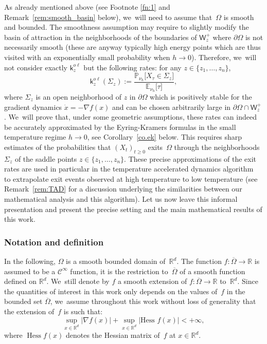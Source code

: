 \documentclass[JEP,XML,SOM,Unicode,NoEqCountersInSection,NoFloatCountersInSection,published]{cedram}
\DeclareMathOperator{\hess}{Hess}\let\Hess\hess
\theoremstyle{plain}
\theoremstyle{definition}
\begin{document}
As already mentioned above (see Footnote \eqref{fn:1} and
Remark~\ref{rem:smooth_basin} below), we~will need to assume that~$\Omega$ is
smooth and bounded. The smoothness assumption may require to slightly modify the basin of
attraction in the neighborhoods of the boundaries of $\mathsf W_z^+$ where
$\partial \Omega$ is not necessarily smooth (these are anyway typically high
energy points which are thus visited with an exponentially small
probability when \hbox{$h \to 0$}). Therefore, we~will
not consider exactly $\mathsf k_{z}^{o\ell}$ but the
following rates: for any $z \in \{z_1, \ldots, z_n\}$,
\begin{equation}\label{kijl}
\mathsf k_{z}^{o\ell}(\Sigma_{z}):=\frac{\mathbb P_{\nu_{h}}\big [
X_{\tau} \in \Sigma_{z} \big]}{\mathbb E_{\nu_{h}}\big [ \tau \big]},
\end{equation}
where $\Sigma_{z}$ is an open neighborhood of $z$ in $\partial
\Omega$ which is positively stable for the gradient dynamics $\dot{x}
= -\nabla f(x)$ and can be chosen arbitrarily large in $ \partial \Omega \cap \mathsf W_z^+$. We~will prove that, under
some geometric assumptions, these rates can indeed be accurately approximated by
the Eyring-Kramers formulas in the small temperature regime $h \to 0$, see Corollary~\ref{co.ek} below. This requires sharp estimates of the
probabilities that $(X_t)_{t \ge 0}$ exits~$\Omega$ through the
neighborhoods $\Sigma_z$
of the saddle points $z \in \{z_1, \ldots, z_n\}$. These
precise approximations of the exit rates are used in particular in the
temperature accelerated dynamics algorithm~\cite{sorensen-voter-00} to extrapolate exit events
observed at high temperature to low temperature
(see Remark~\ref{rem:TAD} for a discussion underlying the similarities between our mathematical
analysis and this algorithm). Let us now
leave this informal presentation and present the precise setting and
the main mathematical results of this work.


\subsubsection{Notation and definition}

In the following, $\Omega$ is a smooth bounded domain of~$\mathbb R^d$. The function $f:\overline \Omega\to \mathbb
R$ is assumed to be a $\mathcal C^\infty$ function, \ie it is the restriction
to~$\overline \Omega$ of a smooth function defined on $\mathbb R^d$. We~still
denote by $f$ a smooth extension of $f:\overline \Omega\to \mathbb
R$ to~$\mathbb R^d$. Since the quantities of interest in this work
only depends on the values of~$f$ in the bounded set
$\overline{\Omega}$, we~assume throughout this work without loss of
generality that the extension of~$f$ is such that:
\begin{equation}\label{eq.DB}
\sup_{x\in \mathbb R^d} |\nabla f(x)|+ \sup_{x\in \mathbb R^d} |\text{Hess } f(x)|<+\infty,
\end{equation}
where $\hess f(x)$ denotes the Hessian matrix of~$f$ at $x\in \mathbb R^d$.
\end{document}
